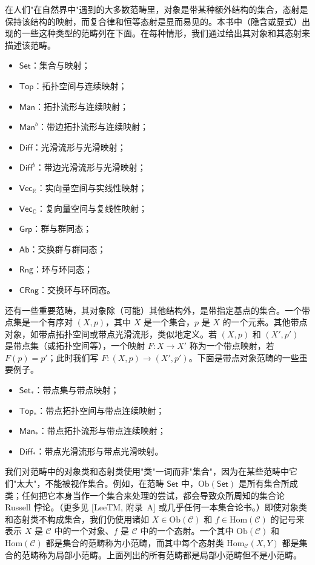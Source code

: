 \documentclass[../../main.tex]{subfiles}
\begin{document}
\begin{example}[范畴]\label{example:ch03-范畴}
在人们"在自然界中"遇到的大多数范畴里，对象是带某种额外结构的集合，态射是保持该结构的映射，而复合律和恒等态射是显而易见的。本书中（隐含或显式）出现的一些这种类型的范畴列在下面。在每种情形，我们通过给出其对象和其态射来描述该范畴。
\begin{itemize}
\item $\mathsf{Set}$：集合与映射；
\item $\mathsf{Top}$：拓扑空间与连续映射；
\item $\mathsf{Man}$：拓扑流形与连续映射；
\item $\mathsf{Man}^{b}$：带边拓扑流形与连续映射；
\item $\mathsf{Diff}$：光滑流形与光滑映射；
\item $\mathsf{Diff}^{b}$：带边光滑流形与光滑映射；
\item $\mathsf{Vec}_{\mathbb{R}}$：实向量空间与实线性映射；
\item $\mathsf{Vec}_{\mathbb{C}}$：复向量空间与复线性映射；
\item $\mathsf{Grp}$：群与群同态；
\item $\mathsf{Ab}$：交换群与群同态；
\item $\mathsf{Rng}$：环与环同态；
\item $\mathsf{CRng}$：交换环与环同态。
\end{itemize}
\end{example}

还有一些重要范畴，其对象除（可能）其他结构外，是带指定基点的集合。一个带点集是一个有序对 $(X,p)$，其中 $X$ 是一个集合，$p$ 是 $X$ 的一个元素。其他带点对象，如带点拓扑空间或带点光滑流形，类似地定义。若 $(X,p)$ 和 $(X',p')$ 是带点集（或拓扑空间等），一个映射 $F:X\to X'$ 称为一个带点映射，若 $F(p)=p'$；此时我们写 $F:(X,p)\to(X',p')$。下面是带点对象范畴的一些重要例子。
\begin{itemize}
\item $\mathsf{Set}_{*}$：带点集与带点映射；
\item $\mathsf{Top}_{*}$：带点拓扑空间与带点连续映射；
\item $\mathsf{Man}_{*}$：带点拓扑流形与带点连续映射；
\item $\mathsf{Diff}_{*}$：带点光滑流形与带点光滑映射。
\end{itemize}

我们对范畴中的对象类和态射类使用"类"一词而非"集合"，因为在某些范畴中它们"太大"，不能被视作集合。例如，在范畴 $\mathsf{Set}$ 中，$\mathrm{Ob}(\mathsf{Set})$ 是所有集合所成类；任何把它本身当作一个集合来处理的尝试，都会导致众所周知的集合论 Russell 悖论。（更多见 [LeeTM, 附录~A] 或几乎任何一本集合论书。）即使对象类和态射类不构成集合，我们仍使用诸如 $X\in\mathrm{Ob}(\mathcal{C})$ 和 $f\in\mathrm{Hom}(\mathcal{C})$ 的记号来表示 $X$ 是 $\mathcal{C}$ 中的一个对象、$f$ 是 $\mathcal{C}$ 中的一个态射。一个其中 $\mathrm{Ob}(\mathcal{C})$ 和 $\mathrm{Hom}(\mathcal{C})$ 都是集合的范畴称为小范畴，而其中每个态射类 $\mathrm{Hom}_{\mathcal{C}}(X,Y)$ 都是集合的范畴称为局部小范畴。上面列出的所有范畴都是局部小范畴但不是小范畴。
\end{document}
